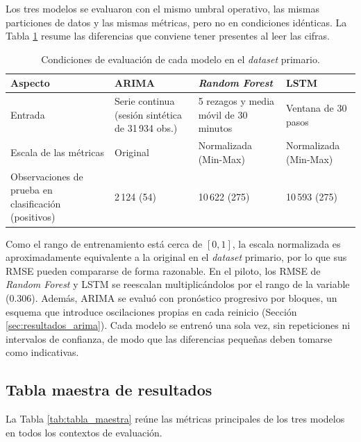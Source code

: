 \documentclass[12pt]{report}
\begin{document}
Los tres modelos se evaluaron con el mismo umbral operativo, las mismas particiones de datos y las mismas métricas, pero no en condiciones idénticas. La Tabla \ref{tab:condiciones_comparacion} resume las diferencias que conviene tener presentes al leer las cifras.

\begin{table}[H]
    \centering
    \small
    \setlength{\tabcolsep}{4pt}
    \begin{tabular}{|p{3.1cm}|p{3.1cm}|p{3.1cm}|p{3.1cm}|}
        \hline
        \textbf{Aspecto} & \textbf{ARIMA} & \textbf{\textit{Random Forest}} & \textbf{LSTM} \\
        \hline
        Entrada & Serie continua (sesión sintética de 31\,934 obs.) & 5 rezagos y media móvil de 30 minutos & Ventana de 30 pasos \\
        \hline
        Escala de las métricas & Original & Normalizada (Min-Max) & Normalizada (Min-Max) \\
        \hline
        Observaciones de prueba en clasificación (positivos) & 2\,124 (54) & 10\,622 (275) & 10\,593 (275) \\
        \hline
    \end{tabular}
    \caption{Condiciones de evaluación de cada modelo en el \textit{dataset} primario.}
    \label{tab:condiciones_comparacion}
\end{table}

Como el rango de entrenamiento está cerca de $[0,1]$, la escala normalizada es aproximadamente equivalente a la original en el \textit{dataset} primario, por lo que sus RMSE pueden compararse de forma razonable. En el piloto, los RMSE de \textit{Random Forest} y LSTM se reescalan multiplicándolos por el rango de la variable (0.306). Además, ARIMA se evaluó con pronóstico progresivo por bloques, un esquema que introduce oscilaciones propias en cada reinicio (Sección \ref{sec:resultados_arima}). Cada modelo se entrenó una sola vez, sin repeticiones ni intervalos de confianza, de modo que las diferencias pequeñas deben tomarse como indicativas.

\subsection*{Tabla maestra de resultados}

La Tabla \ref{tab:tabla_maestra} reúne las métricas principales de los tres modelos en todos los contextos de evaluación.
\end{document}
